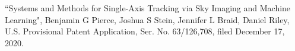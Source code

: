 \documentclass[10pt]{article}
\begin{document}
    
    
%    
%    
%    
%        
    
    
    

{\begin{newitemize}
		\item ``Systems and Methods for Single-Axis Tracking via Sky Imaging and Machine Learning", Benjamin G Pierce, Joshua S Stein, Jennifer L Braid, Daniel Riley, U.S. Provisional Patent Application, Ser. No. 63/126,708, filed December 17, 2020.
\end{newitemize}}


	
%		  
\end{document}
